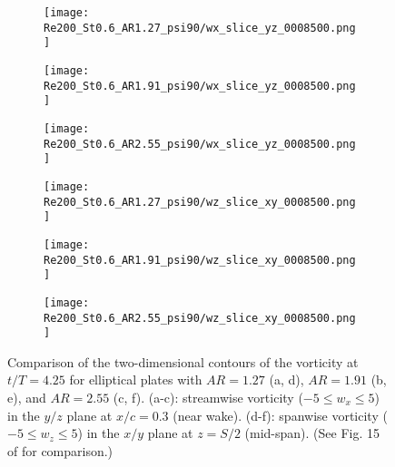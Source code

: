 \begin{figure}[!h]
  \centering
  \begin{subfigure}[c]{0.2\textwidth}
    \centering
    \texttt{[image: Re200\_St0.6\_AR1.27\_psi90/wx\_slice\_yz\_0008500.png]}
    \caption{}
    \label{fig:ratio_vorticity_slices:1.27_wx}
  \end{subfigure}
  \hspace{3em}
  \begin{subfigure}[c]{0.2\textwidth}
    \centering
    \texttt{[image: Re200\_St0.6\_AR1.91\_psi90/wx\_slice\_yz\_0008500.png]}
    \caption{}
    \label{fig:ratio_vorticity_slices:1.91_wx}
  \end{subfigure}
  \hspace{3em}
  \begin{subfigure}[c]{0.23\textwidth}
    \centering
    \texttt{[image: Re200\_St0.6\_AR2.55\_psi90/wx\_slice\_yz\_0008500.png]}
    \caption{}
    \label{fig:ratio_vorticity_slices:2.55_wx}
  \end{subfigure}
  \vspace{0.5em}
  \begin{subfigure}[c]{0.32\textwidth}
    \centering
    \texttt{[image: Re200\_St0.6\_AR1.27\_psi90/wz\_slice\_xy\_0008500.png]}
    \caption{}
    \label{fig:ratio_vorticity_slices:1.27_wz}
  \end{subfigure}
  \hspace{0.2em}
  \begin{subfigure}[c]{0.32\textwidth}
    \centering
    \texttt{[image: Re200\_St0.6\_AR1.91\_psi90/wz\_slice\_xy\_0008500.png]}
    \caption{}
    \label{fig:ratio_vorticity_slices:1.91_wz}
  \end{subfigure}
  \hspace{0.2em}
  \begin{subfigure}[c]{0.32\textwidth}
    \centering
    \texttt{[image: Re200\_St0.6\_AR2.55\_psi90/wz\_slice\_xy\_0008500.png]}
    \caption{}
    \label{fig:ratio_vorticity_slices:2.55_wz}
  \end{subfigure}
  \caption{Comparison of the two-dimensional contours of the vorticity at $t/T = 4.25$ for elliptical plates with $AR = 1.27$ (a, d), $AR = 1.91$ (b, e), and $AR = 2.55$ (c, f). (a-c): streamwise vorticity ($-5 \leq w_x \leq 5$) in the $y/z$ plane at $x/c = 0.3$ (near wake). (d-f): spanwise vorticity ($-5 \leq w_z \leq 5$) in the $x/y$ plane at $z = S/2$ (mid-span). (See Fig. 15 of \citet{li_dong_2016} for comparison.)}
  \label{fig:ratio_vorticity_slices}
\end{figure}

